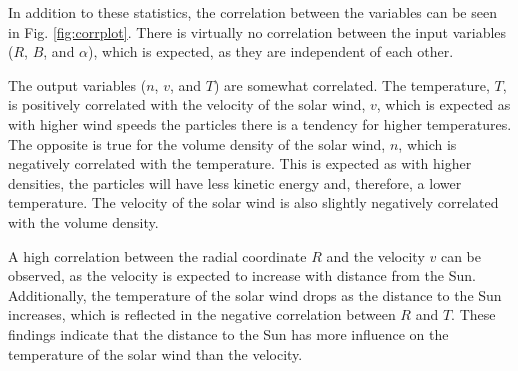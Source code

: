 In addition to these statistics, the correlation between the variables can be seen in Fig. \ref{fig:corrplot}. There is virtually no correlation between the input variables ($R$, $B$, and $\alpha$), which is expected, as they are independent of each other. 

The output variables ($n$, $v$, and $T$) are somewhat correlated. The temperature, $T$, is positively correlated with the velocity of the solar wind, $v$, which is expected as with higher wind speeds the particles there is a tendency for higher temperatures. The opposite is true for the volume density of the solar wind, $n$, which is negatively correlated with the temperature. This is expected as with higher densities, the particles will have less kinetic energy and, therefore, a lower temperature. The velocity of the solar wind is also slightly negatively correlated with the volume density.

A high correlation between the radial coordinate $R$ and the velocity $v$ can be observed, as the velocity is expected to increase with distance from the Sun. Additionally, the temperature of the solar wind drops as the distance to the Sun increases, which is reflected in the negative correlation between $R$ and $T$. These findings indicate that the distance to the Sun has more influence on the temperature of the solar wind than the velocity.

